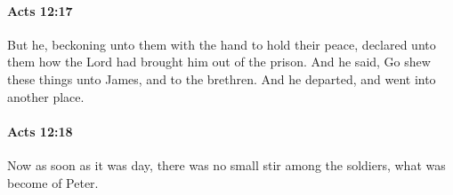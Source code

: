 		\paragraph{Acts 12:17} %
			\label{ACTS-12-17}

			But he, beckoning unto them with the hand to hold their peace, declared unto them how the Lord had brought him out of the prison.  And he said, Go shew these things unto James, and to the brethren.  And he departed, and went into another place.

			\begin{framed}
			\scriptsize
				\begin{compactdesc}
					\item[SBLG] 
				\end{compactdesc}
			\end{framed}

		\paragraph{Acts 12:18} %
			\label{ACTS-12-18}

			Now as soon as it was day, there was no small stir among the soldiers, what was become of Peter.


